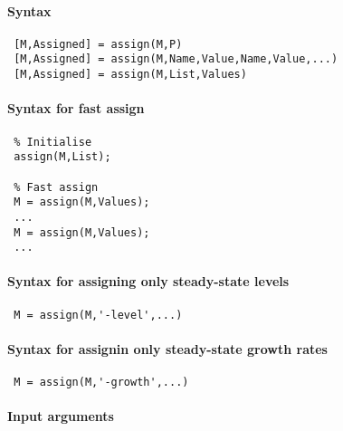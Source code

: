 


	\paragraph{Syntax}
 
 \begin{verbatim}
 [M,Assigned] = assign(M,P)
 [M,Assigned] = assign(M,Name,Value,Name,Value,...)
 [M,Assigned] = assign(M,List,Values)
 \end{verbatim}
 
 \paragraph{Syntax for fast assign}
 
 \begin{verbatim}
 % Initialise
 assign(M,List);
 
 % Fast assign
 M = assign(M,Values);
 ...
 M = assign(M,Values);
 ...
 \end{verbatim}
 
 \paragraph{Syntax for assigning only steady-state levels}
 
 \begin{verbatim}
 M = assign(M,'-level',...)
 \end{verbatim}
 
 \paragraph{Syntax for assignin only steady-state growth rates}
 
 \begin{verbatim}
 M = assign(M,'-growth',...)
 \end{verbatim}
 
 \paragraph{Input arguments}
 
